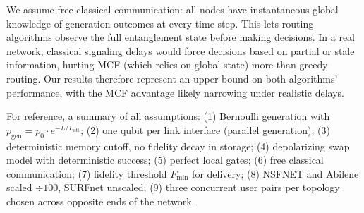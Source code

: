We assume free classical communication: all nodes have instantaneous global knowledge of generation outcomes at every time step. This lets routing algorithms observe the full entanglement state before making decisions. In a real network, classical signaling delays would force decisions based on partial or stale information, hurting MCF (which relies on global state) more than greedy routing. Our results therefore represent an upper bound on both algorithms' performance, with the MCF advantage likely narrowing under realistic delays.

For reference, a summary of all assumptions: (1) Bernoulli generation with $p_\text{gen} = p_0 \cdot e^{-L/L_\text{att}}$; (2) one qubit per link interface (parallel generation); (3) deterministic memory cutoff, no fidelity decay in storage; (4) depolarizing swap model with deterministic success; (5) perfect local gates; (6) free classical communication; (7) fidelity threshold $F_\text{min}$ for delivery; (8) NSFNET and Abilene scaled $\div 100$, SURFnet unscaled; (9) three concurrent user pairs per topology chosen across opposite ends of the network.

